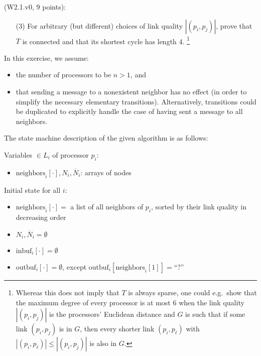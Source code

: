 \begin{Exc}{(W2.1.v0, 9 points):}
\begin{enumerate}
\item[(3)] For arbitrary (but different) choices of link quality
$|(p_i,p_j)|$, prove that $T$ is connected and that its shortest
cycle has length 4.
\footnote{Whereas this does not imply that $T$ is always sparse,
one could e.g.\ show that the maximum degree of every processor is at
most 6 when the link quality $|(p_i,p_j)|$ is the processors' Euclidean
distance and $G$ is such that if some link $(p_i,p_j)$ is
in $G$, then every shorter link $(p_i,p_\ell)$ with $|(p_i,p_\ell)|
\leq |(p_i,p_j)|$ is also in $G$.}
\end{enumerate}
\end{Exc}

In this exercise, we assume:

\begin{itemize}
\item the number of processors to be $n > 1$, and
\item that sending a message to a nonexistent neighbor has no effect (in order
      to simplify the necessary elementary transitions). Alternatively,
      transitions could be duplicated to explicitly handle the case of having
      sent a message to all neighbors.
\end{itemize}


The state machine description of the given algorithm is as follows:

Variables $\in L_i$ of processor $p_i$:
\begin{itemize}
\item $\text{neighbors}_i[\cdot], N_i, \overline{N}_i$: arrays of nodes
\end{itemize}

Initial state for all $i$:
\begin{itemize}
\item $\text{neighbors}_i[\cdot] = $ a list of all neighbors of $p_i$, sorted by their
      link quality in decreasing order
\item $N_i, \overline{N}_i = \emptyset$
\item $\text{inbuf}_i[\cdot] = \emptyset$
\item $\text{outbuf}_i[\cdot] = \emptyset$, except $\text{outbuf}_i[\text{neighbors}_i[1]] = \text{``?''}$
\end{itemize}

